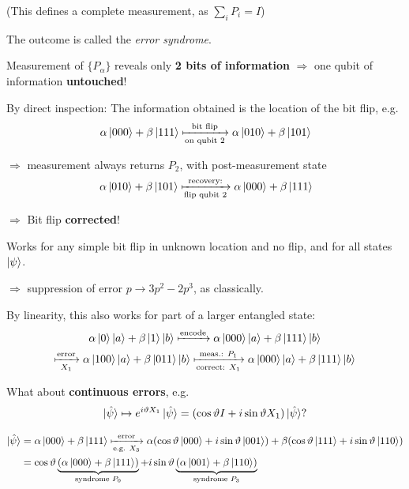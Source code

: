 \documentclass[a4paper, 12pt]{article}
\theoremstyle{plain}
\theoremstyle{definition}
\theoremstyle{remark}
\begin{document}
(This defines a complete measurement, as $\sum_i P_i = I$)

The outcome is called the \emph{error syndrome}.

Measurement of $\{P_\alpha\}$ reveals only \textbf{2 bits of information} $\Longrightarrow$ one qubit of information \textbf{untouched}!

By direct inspection: The information obtained is the location of the bit flip, e.g.
\begin{equation*}
  \alpha \ket{000} + \beta \ket{111} \xmapsto[\text{on qubit 2}]{\text{bit flip}} \alpha \ket{010} + \beta \ket{101}
\end{equation*}

$\Longrightarrow$ measurement always returns $P_2$, with post-measurement state
\begin{equation*}
  \alpha \ket{010} + \beta \ket{101} \xmapsto[\text{flip qubit 2}]{\text{recovery:}}\alpha \ket{000} + \beta \ket{111}\!
\end{equation*}

$\Longrightarrow$ Bit flip \textbf{corrected}!

Works for any simple bit flip in unknown location and no flip, and for all states $\ket{\psi}$.

$\Longrightarrow$ suppression of error $p \rightarrow 3p^2 - 2p^3$, as classically.

By linearity, this also works for part of a larger entangled state:
\begin{multline*}
  \alpha\ket{0}\ket{a}+\beta\ket{1}\ket{b} \xmapsto{\text{encode}} \alpha\ket{000}\ket{a}+\beta\ket{111}\ket{b} \\
  \xmapsto[X_1]{\text{error}}\alpha\ket{100}\ket{a}+\beta\ket{011}\ket{b} \xmapsto[\text{correct: }X_1]{\text{meas.: }P_1}\alpha\ket{000}\ket{a}+\beta\ket{111}\ket{b}
\end{multline*}

What about \textbf{continuous errors}, e.g.
\begin{equation*}
  \ket{\hat{\psi}} \mapsto e^{i \vartheta X_1} \ket{\hat{\psi}} = (\cos \vartheta I + i \sin \vartheta X_1) \ket{\hat{\psi}} ?
\end{equation*}

\begin{align*}
  \ket{\hat{\psi}} &= \alpha\ket{000} + \beta\ket{111} \xmapsto[\text{e.g. }X_3]{\text{error}}
  \alpha (\cos \vartheta \ket{000} + i\sin\vartheta \ket{001})+\beta(\cos \vartheta \ket{111} + i \sin \vartheta \ket{110})\\
  &= \cos \vartheta\underbrace{(\alpha\ket{000} + \beta\ket{111})}_{\text{syndrome } P_0} + i\sin\vartheta \underbrace{(\alpha\ket{001} + \beta\ket{110})}_{\text{syndrome } P_3}
\end{align*}
\end{document}
